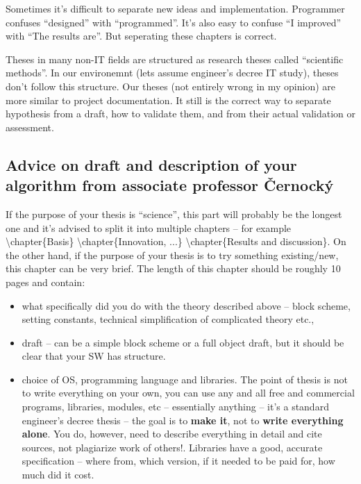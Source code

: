Sometimes it's difficult to separate new ideas and implementation. Programmer confuses ``designed'' with ``programmed''.
It's also easy to confuse ``I improved'' with ``The results are''. But seperating these chapters is correct.

Theses in many non-IT fields are structured as research theses called ``scientific methods''. In our environemnt (lets assume engineer's decree IT study), theses don't follow this structure. Our theses (not entirely wrong in my opinion) are more similar to project documentation. It still is the correct way to separate hypothesis from a draft, how to validate them, and from their actual validation or assessment.


\subsection*{Advice on draft and description of your algorithm from associate professor Černocký}

If the purpose of your thesis is ``science'', this part will probably be the longest one and it's advised to split it into multiple chapters -- for example \textbackslash chapter\{Basis\} \textbackslash chapter\{Innovation, ...\} \textbackslash chapter\{Results and discussion\}. On the other hand, if the purpose of your thesis is to try something existing/new, this chapter can be very brief. The length of this chapter should be roughly 10 pages and contain:
\begin{itemize}
  \item{what specifically did you do with the theory described above -- block scheme, setting constants, technical simplification of complicated theory etc.,}
  \item{draft -- can be a simple block scheme or a full object draft, but it should be clear that your SW has structure.}
  \item{choice of OS, programming language and libraries. The point of thesis is not to write everything on your own, you can use any and all free and commercial programs, libraries, modules, etc -- essentially anything -- it's a standard engineer's decree thesis -- the goal is to \textbf{make it}, not to \textbf{write everything alone}. You do, however, need to describe everything in detail and cite sources, not plagiarize work of others!. Libraries have a good, accurate specification -- where from, which version, if it needed to be paid for, how much did it cost.}
\end{itemize}

